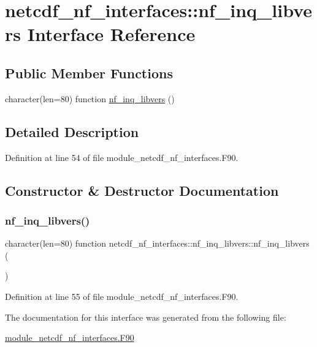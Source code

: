 \hypertarget{interfacenetcdf__nf__interfaces_1_1nf__inq__libvers}{}\section{netcdf\+\_\+nf\+\_\+interfaces\+:\+:nf\+\_\+inq\+\_\+libvers Interface Reference}
\label{interfacenetcdf__nf__interfaces_1_1nf__inq__libvers}
\subsection*{Public Member Functions}
\begin{DoxyCompactItemize}
\item 
character(len=80) function \hyperlink{interfacenetcdf__nf__interfaces_1_1nf__inq__libvers_aa597d29e26f209829ca93cec1ba3e1e6}{nf\+\_\+inq\+\_\+libvers} ()
\end{DoxyCompactItemize}


\subsection{Detailed Description}


Definition at line 54 of file module\+\_\+netcdf\+\_\+nf\+\_\+interfaces.\+F90.



\subsection{Constructor \& Destructor Documentation}
\mbox{\label{interfacenetcdf__nf__interfaces_1_1nf__inq__libvers_aa597d29e26f209829ca93cec1ba3e1e6}} 
\subsubsection{\texorpdfstring{nf\+\_\+inq\+\_\+libvers()}{nf\_inq\_libvers()}}
{\footnotesize\ttfamily character(len=80) function netcdf\+\_\+nf\+\_\+interfaces\+::nf\+\_\+inq\+\_\+libvers\+::nf\+\_\+inq\+\_\+libvers (\begin{DoxyParamCaption}{ }\end{DoxyParamCaption})}



Definition at line 55 of file module\+\_\+netcdf\+\_\+nf\+\_\+interfaces.\+F90.



The documentation for this interface was generated from the following file\+:\begin{DoxyCompactItemize}
\item 
\hyperlink{module__netcdf__nf__interfaces_8F90}{module\+\_\+netcdf\+\_\+nf\+\_\+interfaces.\+F90}\end{DoxyCompactItemize}
